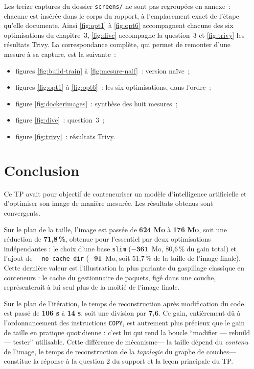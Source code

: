\documentclass[11pt,a4paper]{report}
\newcommand{\num}[1]{\textbf{#1}}
\begin{document}
\begin{encadre}
Les treize captures du dossier \texttt{screens/} ne sont pas regroupées en
annexe~: chacune est insérée dans le corps du rapport, à l'emplacement exact
de l'étape qu'elle documente. Ainsi \ref{fig:opt1} à \ref{fig:opt6}
accompagnent chacune des six optimisations du chapitre~3, \ref{fig:dive}
accompagne la question~3 et \ref{fig:trivy} les résultats Trivy.
La correspondance complète, qui permet de remonter d'une mesure à sa
capture, est la suivante~:

\begin{itemize}[nosep,leftmargin=1.4em]
  \item figures \ref{fig:build-train} à \ref{fig:mesure-naif}~: version naïve~;
  \item figures \ref{fig:opt1} à \ref{fig:opt6}~: les six
        optimisations, dans l'ordre~;
  \item figure \ref{fig:dockerimages}~: synthèse des huit mesures~;
  \item figure \ref{fig:dive}~: question~3~;
  \item figure \ref{fig:trivy}~: résultats Trivy.
\end{itemize}
\end{encadre}


\chapter{Conclusion}

Ce TP avait pour objectif de conteneuriser un modèle d'intelligence artificielle
et d'optimiser son image de manière mesurée. Les résultats obtenus sont
convergents.

Sur le plan de la taille, l'image est passée de \num{624 Mo} à \num{176 Mo},
soit une réduction de \textbf{71,8\,\%}, obtenue pour l'essentiel par deux
optimisations indépendantes : le choix d'une base \texttt{slim}
($-\num{361}$~Mo, 80,6\,\% du gain total) et l'ajout de
\texttt{-{}-no-cache-dir} ($-\num{91}$~Mo, soit 51,7\,\% de la taille de
l'image finale). Cette dernière valeur est l'illustration la plus parlante du
gaspillage classique en conteneurs : le cache du gestionnaire de paquets,
figé dans une couche, représenterait à lui seul plus de la moitié de l'image
finale.

Sur le plan de l'itération, le temps de reconstruction après modification du
code est passé de \num{106 s} à \num{14 s}, soit une division par \textbf{7,6}.
Ce gain, entièrement dû à l'ordonnancement des instructions
\texttt{COPY}, est autrement plus précieux que le gain de taille en pratique
quotidienne : c'est lui qui rend la boucle ``modifier --- rebuild --- tester''
utilisable. Cette différence de mécanisme--- la taille dépend du \emph{contenu}
de l'image, le temps de reconstruction de la \emph{topologie} du graphe de
couches--- constitue la réponse à la question 2 du support et la leçon
principale du TP.
\end{document}
